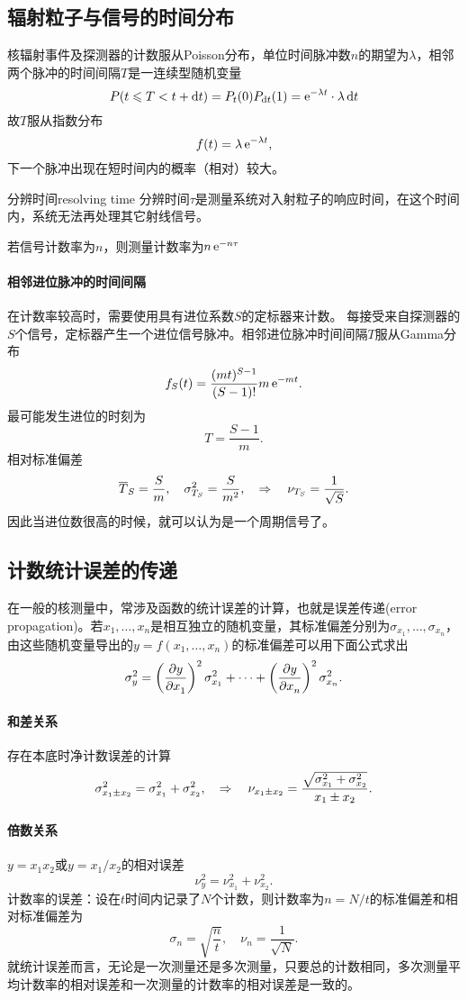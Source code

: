 \subsection{辐射粒子与信号的时间分布}
核辐射事件及探测器的计数服从Poisson分布，单位时间脉冲数$n$的期望为$\lambda$，相邻两个脉冲的时间间隔$T$是一连续型随机变量
\[
	P(t\leqslant T<t+\mathop{}\!\mathrm{d} t)=P_t(0)P_{\mathop{}\!\mathrm{d} t}(1)=\mathop{}\!\mathrm{e}^{-\lambda t}\cdot \lambda\mathop{}\!\mathrm{d} t
\]
故$T$服从指数分布
\[
	f(t)=\lambda\mathop{}\!\mathrm{e}^{-\lambda t},
\]
下一个脉冲出现在短时间内的概率（相对）较大。
\begin{definition}{分辨时间}{resolving time}
	分辨时间$\tau$是测量系统对入射粒子的响应时间，在这个时间内，系统无法再处理其它射线信号。
\end{definition}
若信号计数率为$n$，则测量计数率为$n\mathop{}\!\mathrm{e}^{-n\tau}$
\paragraph{相邻进位脉冲的时间间隔}
在计数率较高时，需要使用具有进位系数$S$的定标器来计数。
每接受来自探测器的$S$个信号，定标器产生一个进位信号脉冲。相邻进位脉冲时间间隔$T$服从Gamma分布
\[
	f_S(t)=\frac{(mt)^{S-1}}{(S-1)!}m\mathop{}\!\mathrm{e}^{-mt}.
\]
最可能发生进位的时刻为
\[
	T=\frac{S-1}m.
\]
相对标准偏差
\[
	\overline T_S=\frac Sm,\quad\sigma_{T_S}^2=\frac S{m^2},\quad\Rightarrow\quad\nu_{T_S}=\frac1{\sqrt S}.
\]
因此当进位数很高的时候，就可以认为是一个周期信号了。
\subsection{计数统计误差的传递}
在一般的核测量中，常涉及函数的统计误差的计算，也就是误差传递(error propagation)。若$x_1,\ldots,x_n$是相互独立的随机变量，其标准偏差分别为$\sigma_{x_1},\ldots,\sigma_{x_n}$，由这些随机变量导出的$y=f(x_1,\ldots,x_n)$的标准偏差可以用下面公式求出
\[
	\sigma_y^2=\kh{\pv y{x_1}}^2\sigma_{x_1}^2+\cdots+\kh{\pv y{x_n}}^2\sigma_{x_n}^2.
\]
\paragraph{和差关系}存在本底时净计数误差的计算
\[
	\sigma_{x_1\pm x_2}^2=\sigma_{x_1}^2+\sigma_{x_2}^2,\quad\Rightarrow\quad\nu_{x_1\pm x_2}=\frac{\sqrt{\sigma_{x_1}^2+\sigma_{x_2}^2}}{x_1\pm x_2}.
\]

\paragraph{倍数关系}$y=x_1x_2$或$y=x_1/x_2$的相对误差
\[
	\nu_y^2=\nu_{x_1}^2+\nu_{x_2}^2.
\]
计数率的误差：设在$t$时间内记录了$N$个计数，则计数率为$n=N/t$的标准偏差和相对标准偏差为
\[
	\sigma_n=\sqrt{\frac nt},\quad\nu_n=\frac1{\sqrt N}.
\]
就统计误差而言，无论是一次测量还是多次测量，只要总的计数相同，多次测量平均计数率的相对误差和一次测量的计数率的相对误差是一致的。
